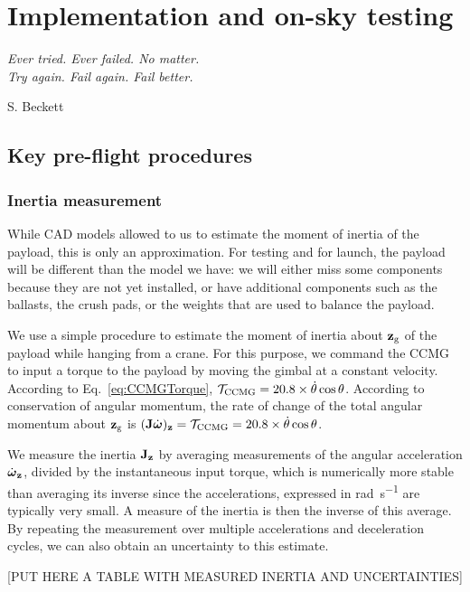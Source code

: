 
\chapter[Implementation and on-sky testing]{Implementation and on-sky testing} %
\label{chap:implementation}

\epigraph{\small\itshape Ever tried. Ever failed. No matter. \\ Try again. Fail again. Fail better.}{S. Beckett}

\section{Key pre-flight procedures}
\subsection{Inertia measurement}
While CAD models allowed to us to estimate the moment of inertia of the payload, this is only an approximation. For testing and for launch, the payload will be different than the model we have: we will either miss some components because they are not yet installed, or have additional components such as the ballasts, the crush pads, or the weights that are used to balance the payload.

We use a simple procedure to estimate the moment of inertia about $\textrm{\textbf{z}}_{\textrm{g}}$ of the payload while hanging from a crane. For this purpose, we command the CCMG to input a torque to the payload by moving the gimbal at a constant velocity. According to Eq.~\ref{eq:CCMGTorque}, $\mathcal{T}_{\textrm{CCMG}} =  20.8\times \dot{\theta}\cos\theta$. According to conservation of angular momentum, the rate of change of the total angular momentum about $\textrm{\textbf{z}}_{\textrm{g}}$ is $(\textrm{\textbf{J}}\dot{\boldsymbol\omega})_{\textrm{\textbf{z}}} = \mathcal{T}_{\textrm{CCMG}} = 20.8\times \dot{\theta}\cos\theta$.

We measure the inertia $\textrm{\textbf{J}}_{\textrm{\textbf{z}}}$ by averaging measurements of the angular acceleration $\dot{\boldsymbol\omega}_{\textrm{\textbf{z}}}$, divided by the instantaneous input torque, which is numerically more stable than averaging its inverse since the accelerations, expressed in \si{\radian\per\second} are typically very small. A measure of the inertia is then the inverse of this average. By repeating the measurement over multiple accelerations and deceleration cycles, we can also obtain an uncertainty to this estimate.

[PUT HERE A TABLE WITH MEASURED INERTIA AND UNCERTAINTIES]

